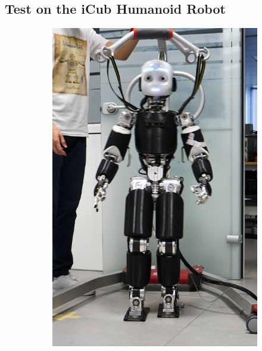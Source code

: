 \subsection{Test on the iCub Humanoid Robot}
\begin{figure}[!t]
        \begin{subfigure}[b]{0.32\textwidth}
        \centering
        \includegraphics[width=\columnwidth]{chapter_centroidal_mpc/figures/icub1.png}
    \end{subfigure}
    \hfill
    \begin{subfigure}[b]{0.32\textwidth}
        \centering

\end{subfigure}
\end{figure}
